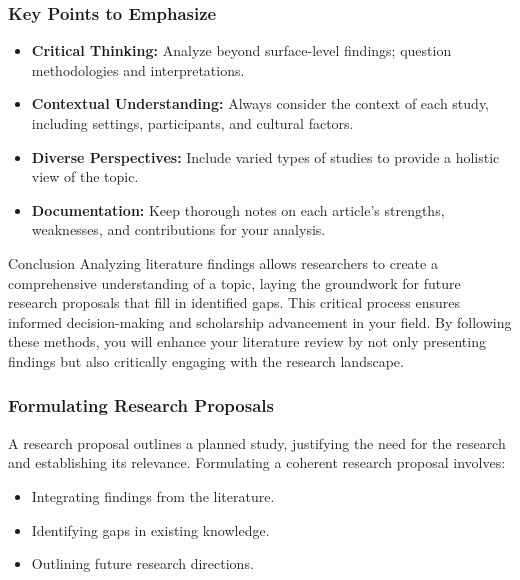 \documentclass[aspectratio=169]{beamer}
\begin{document}
\begin{frame}[fragile]
    \frametitle{Key Points to Emphasize}
    \begin{itemize}
        \item \textbf{Critical Thinking:} Analyze beyond surface-level findings; question methodologies and interpretations.
        \item \textbf{Contextual Understanding:} Always consider the context of each study, including settings, participants, and cultural factors.
        \item \textbf{Diverse Perspectives:} Include varied types of studies to provide a holistic view of the topic.
        \item \textbf{Documentation:} Keep thorough notes on each article's strengths, weaknesses, and contributions for your analysis.
    \end{itemize}
    
    \begin{block}{Conclusion}
        Analyzing literature findings allows researchers to create a comprehensive understanding of a topic, laying the groundwork for future research proposals that fill in identified gaps. This critical process ensures informed decision-making and scholarship advancement in your field. By following these methods, you will enhance your literature review by not only presenting findings but also critically engaging with the research landscape.
    \end{block}
\end{frame}

\begin{frame}[fragile]
    \frametitle{Formulating Research Proposals}
    A research proposal outlines a planned study, justifying the need for the research and establishing its relevance.  
    Formulating a coherent research proposal involves:
    \begin{itemize}
        \item Integrating findings from the literature.
        \item Identifying gaps in existing knowledge.
        \item Outlining future research directions.
    \end{itemize}
\end{frame}
\end{document}
